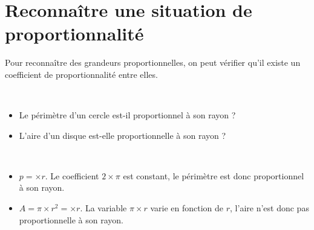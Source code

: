 \section{Reconnaître une situation de proportionnalité}

Pour reconnaître des grandeurs proportionnelles, on peut vérifier qu'il existe un coefficient de proportionnalité entre elles.
\vspace*{-5mm}

\begin{exemple}
\ \\ [-10mm]
   \begin{itemize}
      \item Le périmètre d'un cercle est-il proportionnel à son rayon ?
      \item L'aire d'un disque est-elle proportionnelle à son rayon ?
   \end{itemize}
   \correction
    \ \\ [-10mm]
       \begin{itemize}
         \item $p =$\fbox{$2\times\pi$}$\times r$. Le coefficient $2\times\pi$ est constant, le périmètre est donc proportionnel à son rayon.
         \item  $A =\pi\times r^2 =$$\times r$. La variable $\pi\times r$ varie en fonction de $r$, l'aire n'est donc pas proportionnelle à son rayon.
      \end{itemize}
  \end{exemple}